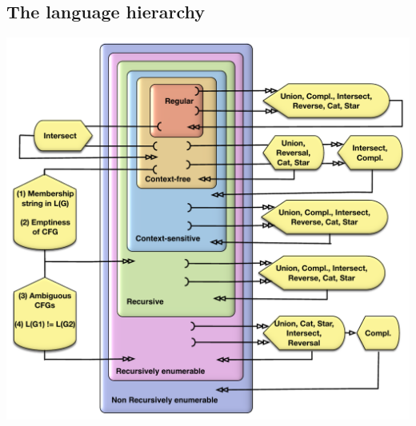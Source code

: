 \documentclass[10pt]{article}
\begin{document}
\subsection{The language hierarchy}



\begin{center}
\includegraphics[angle=0,width=.5\linewidth]{DecidabilityDiagram.pdf}
\end{center}
\end{document}

